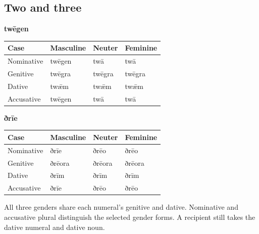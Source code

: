 \subsection*{Two and three}

\textbf{twēgen}

\par\begingroup
\fontsize{10.5}{13.2}\selectfont
\setlength{\LTleft}{0pt}\setlength{\LTright}{\fill}
\noindent
\begin{tabular}{@{}>{\raggedright\arraybackslash}p{22.0mm}>{\raggedright\arraybackslash}p{31.188mm}>{\raggedright\arraybackslash}p{31.188mm}>{\raggedright\arraybackslash}p{31.188mm}@{}}
\toprule
\textbf{Case} & \textbf{Masculine} & \textbf{Neuter} & \textbf{Feminine} \\
\midrule
Nominative & twēgen & twā & twā \\
Genitive & twēgra & twēgra & twēgra \\
Dative & twǣm & twǣm & twǣm \\
Accusative & twēgen & twā & twā \\
\bottomrule
\end{tabular}
\par\endgroup
\textbf{ðrīe}

\par\begingroup
\fontsize{10.5}{13.2}\selectfont
\setlength{\LTleft}{0pt}\setlength{\LTright}{\fill}
\noindent
\begin{tabular}{@{}>{\raggedright\arraybackslash}p{22.0mm}>{\raggedright\arraybackslash}p{31.188mm}>{\raggedright\arraybackslash}p{31.188mm}>{\raggedright\arraybackslash}p{31.188mm}@{}}
\toprule
\textbf{Case} & \textbf{Masculine} & \textbf{Neuter} & \textbf{Feminine} \\
\midrule
Nominative & ðrīe & ðrēo & ðrēo \\
Genitive & ðrēora & ðrēora & ðrēora \\
Dative & ðrīm & ðrīm & ðrīm \\
Accusative & ðrīe & ðrēo & ðrēo \\
\bottomrule
\end{tabular}
\par\endgroup
All three genders share each numeral’s genitive and dative. Nominative and accusative plural distinguish the selected gender forms. A recipient still takes the dative numeral and dative noun.

